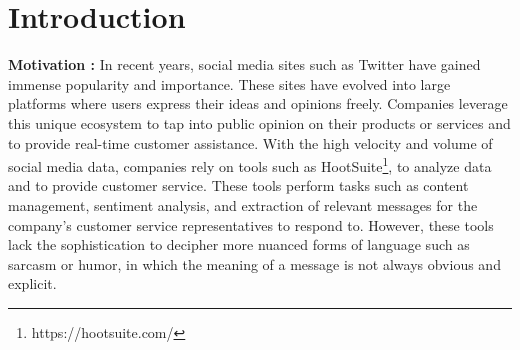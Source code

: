 \section{Introduction}
\textbf{Motivation :} In recent years, social media sites such as Twitter have gained immense popularity and importance. These sites have
evolved into large platforms where users express their ideas and opinions freely. Companies leverage this unique
ecosystem to tap into public opinion on their products or services and to provide real-time customer assistance. With the high velocity and volume of social media data, companies rely on tools such as HootSuite\footnote{https://hootsuite.com/}, to analyze data and to provide customer service. These tools perform tasks such as content management, sentiment analysis, and extraction of relevant messages for the company's customer service representatives to respond to. However, these tools lack the sophistication to decipher more nuanced forms of language such as sarcasm or humor, in which the meaning of a message is not always obvious and explicit.\\

